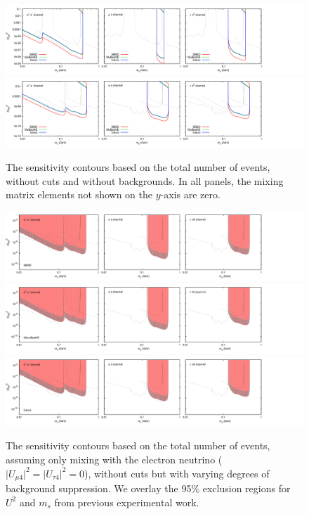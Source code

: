 \documentclass[11pt, a4paper]{article}
\begin{document}
\begin{figure}[t]
\center
\includegraphics[width=1.0\textwidth,clip,trim=0 20 300 15]{figures/zerobg_um4_all_panels.pdf}
\includegraphics[width=1.0\textwidth,clip,trim=0 20 300 15]{figures/zerobg_ue4_all_panels.pdf}

\caption{\label{fig:no_cuts_no_bkg}The sensitivity contours based on the total number of events, without cuts and without backgrounds. In all panels, the mixing matrix elements not shown on the $y$-axis are zero.}

\end{figure}

\begin{figure}[t]
\center
\includegraphics[width=1.0\textwidth,clip,trim=0 20 300 15]{figures/sbnd_all_panels_ue4.pdf}
\includegraphics[width=1.0\textwidth,clip,trim=0 20 300 15]{figures/muboone_all_panels_ue4.pdf}
\includegraphics[width=1.0\textwidth,clip,trim=0 20 300 15]{figures/icarus_all_panels_ue4.pdf}

\caption{\label{fig:no_cuts_scaled_bkg_ue4_only}The sensitivity contours based on the total
	number of events, assuming only mixing with the electron neutrino ( $\vert U_{\mu 4}\vert^2=\vert U_{\tau 4}\vert^2=0$), without cuts but with varying degrees of background
suppression. We overlay the 95\% exclusion regions for $U^2$ and $m_s$ from
previous experimental work.}

\end{figure}
\end{document}
